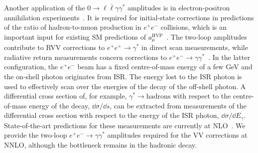 \documentclass[main.tex]{subfiles}
\begin{document}
Another application of the $0\to \ell \bar\ell \gamma \gamma^*$ amplitudes is in electron-positron annihilation experiments~\cite{precisionsm}.
It is required for initial-state corrections in predictions of the ratio of hadron-to-muon production in $e^+e^-$ collisions, which is an important input for existing \ac{SM} predictions of $a^{\text{HVP}}_\mu$~\cite{Abbiendi:2022liz}.
The two-loop amplitudes contribute to \ac{RVV} corrections to $e^+e^+\to\gamma^*$ in direct scan measurements, while radiative return measurements concern corrections to $e^+e^-\to\gamma\gamma^*$~\cite{Aoyama:2020ynm}.
In the latter configuration, the $e^+e^-$ beam has a fixed centre-of-mass energy of a few GeV and the on-shell photon originates from \ac{ISR}.
The energy lost to the \ac{ISR} photon is used to effectively scan over the energies of the decay of the off-shell photon.
A differential cross section of, for example, $\gamma^*\to\text{hadrons}$ with respect to the centre-of-mass energy of the decay, $\dd\sigma/\dd s$, can be extracted from measurements of the differential cross section with respect to the energy of the \ac{ISR} photon, $\dd\sigma/\dd E_\gamma$.
State-of-the-art predictions for these measurements are currently at \ac{NLO}~\cite{Abbiendi:2022liz}.
We provide the two-loop $e^+e^-\to\gamma\gamma^*$ amplitudes required for the \ac{VV} corrections at \ac{NNLO}, although the bottleneck remains in the hadronic decay.
\end{document}
